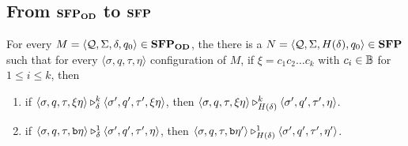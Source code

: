 \subsection{From $\mathbf{SFP_{\mathbf{OD}}}$ to $\mathbf{SFP}$}
\label{app:sfpodtosfp}
\begin{lemma}
  \label{lemma:SFPODtoSFPtech}
  For every $M = \langle \mathcal{Q}, \Sigma, \delta, q_0\rangle
  \in \mathbf{SFP_{\mathbf{OD}}}$, the there is a $N = \langle \mathcal{Q}, \Sigma, H(\delta), q_0\rangle
  \in\mathbf{SFP}$ such that
  for every $\langle \sigma, q, \tau, \eta\rangle$ configuration of $M$, if
  $\xi =c_1c_2\ldots c_k$ with $c_i \in \mathbb{B}$ for $1 \le i \le k$, then
  \begin{enumerate}
    \item if $\langle \sigma, q, \tau, \xi\eta\rangle \triangleright^{k}_{\delta} \langle \sigma', q', \tau', \xi\eta\rangle$, then
    $\langle \sigma, q, \tau, \xi\eta\rangle \triangleright^{k}_{H(\delta)} \langle \sigma', q', \tau', \eta\rangle$.
    \item if $\langle \sigma, q, \tau, \mathtt{b}\eta\rangle \triangleright^{1}_{\delta} \langle \sigma', q', \tau', \eta\rangle$, then
    $\langle \sigma, q, \tau, \mathtt{b}\eta'\rangle \triangleright^{1}_{H(\delta)} \langle \sigma', q', \tau', \eta'\rangle$.
  \end{enumerate}
\end{lemma}
